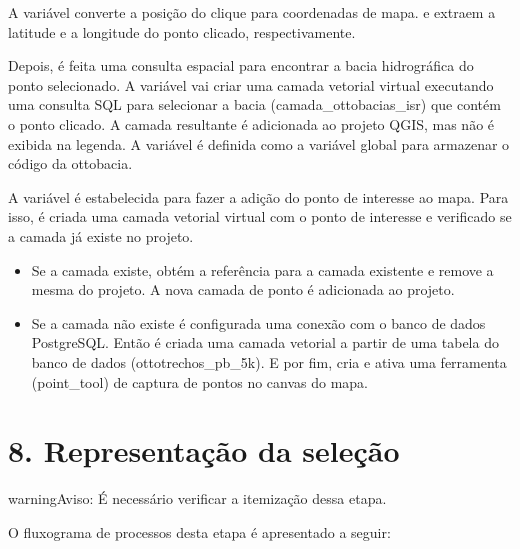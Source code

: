 \documentclass[a4paper,10pt,brazil]{sphinxmanual}
\begin{document}
\sphinxAtStartPar
A variável  converte a posição do clique para coordenadas de mapa.  e  extraem a latitude e a longitude do ponto clicado, respectivamente.

\sphinxAtStartPar
Depois, é feita uma consulta espacial para encontrar a bacia hidrográfica do ponto selecionado. A variável  vai criar uma camada vetorial virtual executando uma consulta SQL para selecionar a bacia (camada\_ottobacias\_isr) que contém o ponto clicado. A camada resultante é adicionada ao projeto QGIS, mas não é exibida na legenda. A variável  é definida como a variável global para armazenar o código da ottobacia.

\sphinxAtStartPar
A variável  é estabelecida para fazer a adição do ponto de interesse ao mapa. Para isso, é criada uma camada vetorial virtual com o ponto de interesse e verificado se a camada já existe no projeto.
\begin{itemize}
\item {} 
\sphinxAtStartPar
Se a camada existe, obtém a referência para a camada existente e remove a mesma do projeto. A nova camada de ponto é adicionada ao projeto.

\item {} 
\sphinxAtStartPar
Se a camada não existe é configurada uma conexão com o banco de dados PostgreSQL. Então é criada uma camada vetorial  a partir de uma tabela do banco de dados (ottotrechos\_pb\_5k). E por fim, cria e ativa uma ferramenta (point\_tool) de captura de pontos no canvas do mapa.

\end{itemize}

\sphinxstepscope


\section{8. Representação da seleção}
\label{\detokenize{8representacaoSelecao:representacao-da-selecao}}\label{\detokenize{8representacaoSelecao::doc}}
\begin{sphinxadmonition}{warning}{Aviso:}
\sphinxAtStartPar
É necessário verificar a itemização dessa etapa.
\end{sphinxadmonition}

\sphinxAtStartPar
O fluxograma de processos desta etapa é apresentado a seguir:
\end{document}
